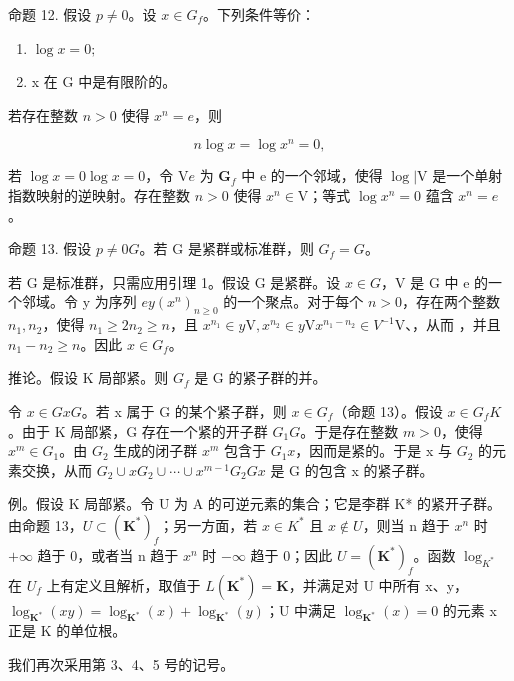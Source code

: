 命题 12. 假设 \(p \neq 0\)。设 \(x \in G_f\)。下列条件等价：

\begin{enumerate}
\def\labelenumi{(\roman{enumi})}
\item
  \(\log x = 0;\)
\item
  x 在 G 中是有限阶的。
\end{enumerate}

若存在整数 \(n > 0\) 使得 \(x^n = e\)，则

\[
n \log x = \log x ^ {n} = 0,
\]

若 \(\log x = 0\)\(\log x = 0\)，令 \(\mathrm{V}\)\(e\) 为 \(\mathbf{G}_f\) 中 e 的一个邻域，使得 \(\log |\mathrm{V}\) 是一个单射指数映射的逆映射。存在整数 \(n > 0\) 使得 \(x^n \in \mathrm{V}\)；等式 \(\log x^n = 0\) 蕴含 \(x^n = e\)。

命题 13. 假设 \(p \neq 0\)\(G\)。若 G 是紧群或标准群，则 \(G_f = G\)。

若 G 是标准群，只需应用引理 1。假设 G 是紧群。设 \(x \in G\)，V 是 G 中 e 的一个邻域。令 y 为序列 \(e\)\(y\)\((x^n)_{n \geqslant 0}\) 的一个聚点。对于每个 \(n > 0\)，存在两个整数 \(n_1, n_2\)，使得 \(n_1 \geqslant 2n_2 \geqslant n\)，且 \(x^{n_1} \in y\mathrm{V}, x^{n_2} \in y\mathrm{V}\)\(x^{n_1 - n_2} \in V^{-1}\mathrm{V}\)、，从而 ，并且 \(n_1 - n_2 \geqslant n\)。因此 \(x \in G_f\)。

推论。假设 K 局部紧。则 \(G_{f}\) 是 G 的紧子群的并。

令 \(x \in G\)\(x\)\(G\)。若 x 属于 G 的某个紧子群，则 \(x \in G_f\)（命题 13）。假设 \(x \in G_f\)\(K\)。由于 K 局部紧，G 存在一个紧的开子群 \(G_1\)\(G\)。于是存在整数 \(m > 0\)，使得 \(x^m \in G_1\)。由 \(G_2\) 生成的闭子群 \(x^m\) 包含于 \(G_1\)\(x\)，因而是紧的。于是 x 与 \(G_2\) 的元素交换，从而 \(G_2 \cup xG_2 \cup \cdots \cup x^{m-1}G_2\)\(G\)\(x\) 是 G 的包含 x 的紧子群。

例。假设 K 局部紧。令 U 为 A 的可逆元素的集合；它是李群 K* 的紧开子群。由命题 13，\(U \subset (\mathbf{K}^{*})_{f}\)；另一方面，若 \(x \in K^{*}\) 且 \(x \notin U\)，则当 n 趋于 \(x^{n}\) 时 \(+\infty\) 趋于 0，或者当 n 趋于 \(x^{n}\) 时 \(-\infty\) 趋于 0；因此 \(U = (\mathbf{K}^{*})_{f}\)。函数 \(\log_{K^{*}}\) 在 \(U_{f}\) 上有定义且解析，取值于 \(L(\mathbf{K}^{*}) = \mathbf{K}\)，并满足对 U 中所有 x、y，\(\log_{\mathbf{K}^{*}}(xy) = \log_{\mathbf{K}^{*}}(x) + \log_{\mathbf{K}^{*}}(y)\)；U 中满足 \(\log_{\mathbf{K}^{*}}(x) = 0\) 的元素 x 正是 K 的单位根。

我们再次采用第 3、4、5 号的记号。

